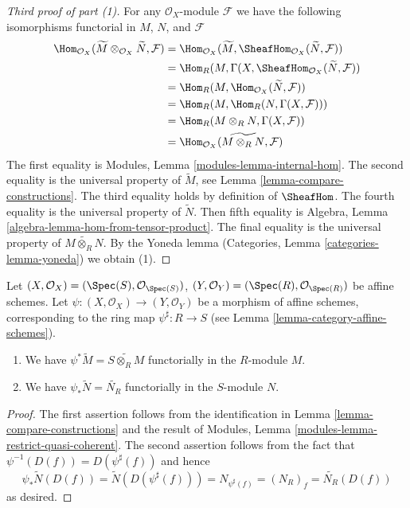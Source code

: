 \begin{proof}[Third proof of part (1)]
For any $\mathcal{O}_X$-module $\mathcal{F}$
we have the following isomorphisms functorial in $M$, $N$, and $\mathcal{F}$
\begin{align*}
\Hom_{\mathcal{O}_X}(\widetilde{M} \otimes _{\mathcal{O} _X} \widetilde{N},
\mathcal{F})
& =
\Hom_{\mathcal{O}_X}(\widetilde{M},
\SheafHom_{\mathcal{O} _X} (\widetilde{N}, \mathcal{F})) \\
& =
\Hom_R(M, \Gamma(X,
\SheafHom_{\mathcal{O}_X}(\widetilde{N}, \mathcal{F})) \\
& =
\Hom_R(M, \Hom_{\mathcal{O}_X}(\widetilde{N}, \mathcal{F})) \\
& =
\Hom_R(M, \Hom_R(N, \Gamma(X,\mathcal{F}))) \\
& =
\Hom_R(M \otimes_R N, \Gamma(X, \mathcal{F})) \\
& =
\Hom_{\mathcal{O}_X}(\widetilde{M \otimes_R N}, \mathcal{F})
\end{align*}
The first equality is Modules, Lemma \ref{modules-lemma-internal-hom}.
The second equality is the universal property of $\widetilde{M}$, see
Lemma \ref{lemma-compare-constructions}. The third equality holds by
definition of $\SheafHom$. The fourth equality is the universal property
of $\widetilde{N}$. Then fifth equality is
Algebra, Lemma \ref{algebra-lemma-hom-from-tensor-product}.
The final equality is the universal property of
$\widetilde{M \otimes_R N}$.
By the Yoneda lemma (Categories, Lemma \ref{categories-lemma-yoneda})
we obtain (1).
\end{proof}

\begin{lemma}
\label{lemma-widetilde-pullback}
Let
$(X, \mathcal{O}_X) = (\Spec(S), \mathcal{O}_{\Spec(S)})$,
$(Y, \mathcal{O}_Y) = (\Spec(R), \mathcal{O}_{\Spec(R)})$
be affine schemes.
Let $\psi : (X, \mathcal{O}_X) \to (Y, \mathcal{O}_Y)$ be a
morphism of affine schemes, corresponding to the ring map
$\psi^\sharp : R \to S$ (see Lemma \ref{lemma-category-affine-schemes}).
\begin{enumerate}
\item We have $\psi^* \widetilde M = \widetilde{S \otimes_R M}$
functorially in the $R$-module $M$.
\item We have $\psi_* \widetilde N = \widetilde{N_R}$ functorially
in the $S$-module $N$.
\end{enumerate}
\end{lemma}

\begin{proof}
The first assertion follows from the identification in
Lemma \ref{lemma-compare-constructions}
and the result of Modules, Lemma \ref{modules-lemma-restrict-quasi-coherent}.
The second assertion follows from the fact
that $\psi^{-1}(D(f)) = D(\psi^\sharp(f))$ and hence
$$
\psi_* \widetilde N(D(f)) = \widetilde N(D(\psi^\sharp(f))) =
N_{\psi^\sharp(f)} = (N_R)_f = \widetilde{N_R}(D(f))
$$
as desired.
\end{proof}

